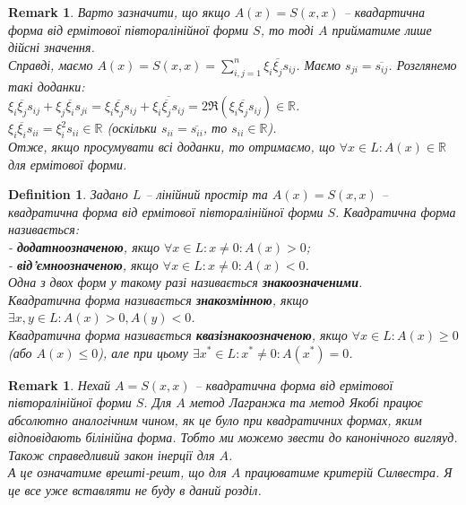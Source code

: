 \documentclass[a4paper, 10pt]{article}
\theoremstyle{theoremdd}
\newtheorem{definition}[theorem]{Definition}
\newtheorem{remark}[theorem]{Remark}
\begin{document}
\begin{remark}
Варто зазначити, що якщо $A(x) = S(x,x)$ -- квадартична форма від ермітової півторалінійної форми $S$, то тоді $A$ прийматиме лише дійсні значення.\\
Справді, маємо $A(x) = S(x,x) = \displaystyle\sum_{i,j=1}^n \xi_i \overline{\xi_j} s_{ij}$. Маємо $s_{ji} = \overline{s_{ij}}$. Розглянемо такі доданки:\\
$\xi_i \overline{\xi_j} s_{ij} + \xi_j \overline{\xi_i} s_{ji} = \xi_i \overline{\xi_j} s_{ij} + \overline{\xi_i \overline{\xi_j} s_{ij}} = 2 \Re (\xi_i \overline{\xi_j} s_{ij}) \in \mathbb{R}$.\\
$\xi_i \overline{\xi_i} s_{ii} = \xi_i^2 s_{ii} \in \mathbb{R}$ (оскільки $s_{ii} = \overline{s_{ii}}$, то $s_{ii} \in \mathbb{R}$).\\
Отже, якщо просумувати всі доданки, то отримаємо, що $\forall x \in L: A(x) \in \mathbb{R}$ для ермітової форми.
\end{remark}

\begin{definition}
Задано $L$ -- лінійний простір та $A(x) = S(x,x)$ -- квадратична форма від ермітової півторалінійної форми $S$. Квадратична форма називається:\\
- \textbf{додатноозначеною}, якщо $\forall x \in L: x \neq 0: A(x) > 0$;\\
- \textbf{від'ємноозначеною}, якщо $\forall x \in L: x \neq 0: A(x) < 0$.\\
Одна з двох форм у такому разі називається \textbf{знакоозначеними}.
\bigskip \\
Квадратична форма називається \textbf{знакозмінною}, якщо $\exists x,y \in L: A(x) >0, A(y) < 0$.\\
Квадратична форма називається \textbf{квазізнакоозначеною}, якщо $\forall x \in L: A(x) \geq 0$ (або $A(x) \leq 0$), але при цьому $\exists x^* \in L: x^* \neq 0: A(x^*) = 0$.
\end{definition}

\begin{remark}
Нехай $A = S(x,x)$ -- квадратична форма від ермітової півторалінійної форми $S$.
Для $A$ метод Лагранжа та метод Якобі працює абсолютно аналогічним чином, як це було при квадратичних формах, яким відповідають білінійна форма. Тобто ми можемо звести до канонічного вигляуд. \\
Також справедливий закон інерції для $A$. \\
А це означатиме врешті-решт, що для $A$ працюватиме критерій Силвестра. Я це все уже вставляти не буду в даний розділ.
\end{remark}
\end{document}
